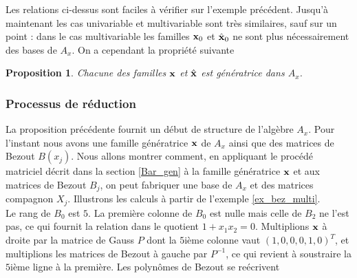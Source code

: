 \documentclass{article}
\theoremstyle{plain}%
\newtheorem{prop}{Proposition}
\theoremstyle{definition}
\theoremstyle{remark}
\begin{document}
Les relations ci-dessus sont faciles à vérifier sur l'exemple précédent. Jusqu'à maintenant les cas univariable et multivariable sont très similaires, sauf sur un point : dans le cas multivariable les familles $\bold{x}_0$ et $\hat{\bold{x}}_0$ ne sont plus nécessairement des bases de $A_x$. On a cependant la propriété suivante

\begin{prop}
Chacune des familles $\bold{x}$ et $\hat{\bold{x}}$ est génératrice dans $A_x$.
\end{prop}





\subsubsection{Processus de réduction}
La proposition précédente fournit un début de structure de l'algèbre $A_x$. Pour l'instant nous avons une famille génératrice $\bold{x}$ de $A_x$ ainsi que des matrices de Bezout $B(x_j)$.
Nous allons montrer comment, en appliquant le procédé matriciel décrit dans la section \ref{Bar_gen} à la famille génératrice $\bold{x}$ et aux matrices de Bezout $B_j$, on peut fabriquer une base de $A_x$ et des matrices compagnon $X_j$.
Illustrons les calculs à partir de l'exemple \ref{ex_bez_multi}.\\
Le rang de $B_0$ est $5$. La première colonne de $B_0$ est nulle mais celle de $B_2$ ne l'est pas, ce qui fournit la relation dans le quotient $1 + x_1x_2 = 0$.
Multiplions $\bold{x}$ à droite par la matrice de Gauss $P$ dont la $5$ième colonne vaut $(1, 0, 0, 0, 1, 0)^{T}$, et multiplions les matrices de Bezout à gauche par $P^{-1}$, ce qui revient à soustraire la $5$ième ligne à la première.
Les polynômes de Bezout se reécrivent\\
\end{document}
